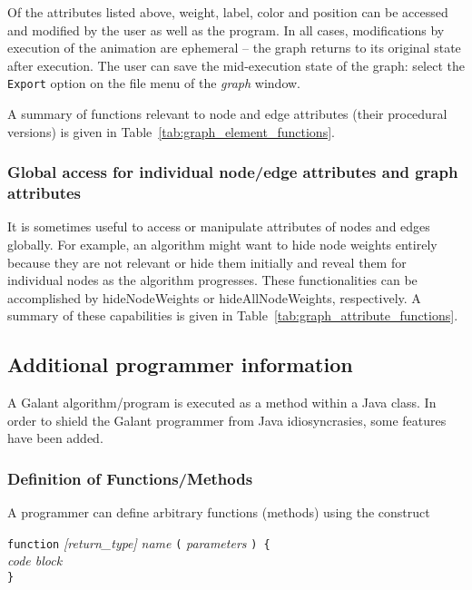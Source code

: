 Of the attributes listed above, weight, label, color and position can be
accessed and modified by the user as well as the program.
In all cases, modifications by execution of the animation are ephemeral
-- the graph returns to its original state after execution.
The user can save the mid-execution state of the graph:
select the \texttt{Export} option on the file menu of the
\emph{graph} window.



A summary of functions relevant to node and edge attributes (their procedural versions)
is given in Table~\ref{tab:graph_element_functions}.

\subsubsection{Global access for individual node/edge attributes and graph attributes}



It is sometimes useful to access or manipulate attributes of nodes and edges
globally.
For example, an algorithm might want to hide node weights entirely
because they are not relevant
or hide them initially and reveal them for individual nodes as
the algorithm progresses.
These functionalities can be accomplished by
\textsf{hideNodeWeights} or \textsf{hideAllNodeWeights}, respectively.
A summary of these capabilities is given in Table~\ref{tab:graph_attribute_functions}.

\subsection{Additional programmer information}

A Galant algorithm/program is executed as a method within a Java class.
In order to shield the Galant programmer from Java idiosyncrasies,
some features have been added.

\subsubsection{Definition of Functions/Methods}\label{sec:functions}

A programmer can define arbitrary functions (methods) using the construct

\texttt{function} \textsl{[return\_type]} \textsl{name} \texttt{(}
 \textsl{parameters} \texttt{) \{} \\
 \hspace*{3em} \emph{code block} \\
 \texttt{\}}

